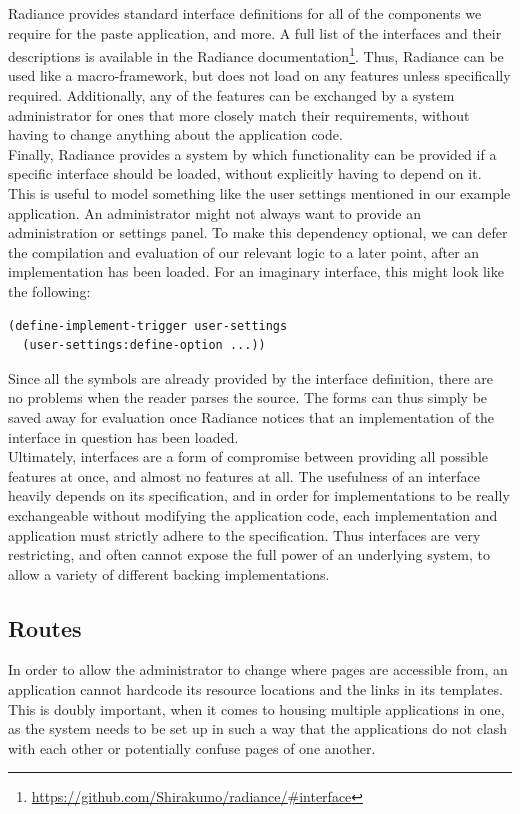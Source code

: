 \documentclass{sig-alternate}
\begin{document}
Radiance provides standard interface definitions for all of the components we require for the paste application, and more. A full list of the interfaces and their descriptions is available in the Radiance documentation\footnote{\url{https://github.com/Shirakumo/radiance/\#interface}}. Thus, Radiance can be used like a macro-framework, but does not load on any features unless specifically required. Additionally, any of the features can be exchanged by a system administrator for ones that more closely match their requirements, without having to change anything about the application code.\\

Finally, Radiance provides a system by which functionality can be provided if a specific interface should be loaded, without explicitly having to depend on it. This is useful to model something like the user settings mentioned in our example application. An administrator might not always want to provide an administration or settings panel. To make this dependency optional, we can defer the compilation and evaluation of our relevant logic to a later point, after an implementation has been loaded. For an imaginary  interface, this might look like the following:

\begin{verbatim}
(define-implement-trigger user-settings
  (user-settings:define-option ...))
\end{verbatim}

Since all the symbols are already provided by the interface definition, there are no problems when the reader parses the source. The forms can thus simply be saved away for evaluation once Radiance notices that an implementation of the interface in question has been loaded. \\

Ultimately, interfaces are a form of compromise between providing all possible features at once, and almost no features at all. The usefulness of an interface heavily depends on its specification, and in order for implementations to be really exchangeable without modifying the application code, each implementation and application must strictly adhere to the specification. Thus interfaces are very restricting, and often cannot expose the full power of an underlying system, to allow a variety of different backing implementations.

\subsection{Routes}
In order to allow the administrator to change where pages are accessible from, an application cannot hardcode its resource locations and the links in its templates. This is doubly important, when it comes to housing multiple applications in one, as the system needs to be set up in such a way that the applications do not clash with each other or potentially confuse pages of one another. \\
\end{document}
